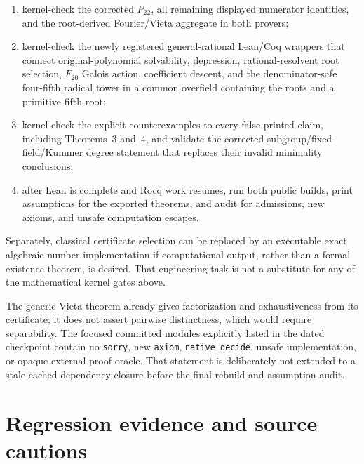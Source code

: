 \documentclass[11pt,a4paper,oneside]{article}
\newcommand{\lean}[1]{\nolinkurl{#1}}
\begin{document}
\begin{enumerate}
  the concrete six-element bases through the public imports.  The Coq source
  now proves coefficientwise that multiplication by the symmetric denominator
  gives $1+t^4+t^5+t^6+t^7+t^8$ and identifies this polynomial with the
  actual six displayed basis degrees; this closes the former source gap, but
  the new dependency graph still awaits its focused and public kernel builds;
\item kernel-check the corrected $P_{22}$, all remaining displayed numerator
  identities, and the root-derived Fourier/Vieta aggregate in both provers;
\item kernel-check the newly registered general-rational Lean/Coq wrappers
  that connect original-polynomial solvability, depression, rational-resolvent
  root selection, $F_{20}$ Galois action, coefficient descent, and the
  denominator-safe four-fifth radical tower in a common overfield containing
  the roots and a primitive fifth root;
\item kernel-check the explicit counterexamples to every false printed claim,
  including Theorems~3 and~4, and validate the corrected
  subgroup/fixed-field/Kummer degree statement that replaces their invalid
  minimality conclusions;
\item after Lean is complete and Rocq work resumes, run both public builds,
  print assumptions for the exported theorems, and audit for admissions, new
  axioms, and unsafe computation escapes.
\end{enumerate}

Separately, classical certificate selection can be replaced by an executable
exact algebraic-number implementation if computational output, rather than a
formal existence theorem, is desired.  That engineering task is not a
substitute for any of the mathematical kernel gates above.

The generic Vieta theorem already gives factorization and exhaustiveness from
its certificate; it does not assert pairwise distinctness, which would require
separability.  The focused committed modules explicitly listed in the dated
checkpoint contain no \lean{sorry}, new \lean{axiom}, \lean{native_decide},
unsafe implementation, or opaque external proof oracle.  That statement is
deliberately not extended to a stale cached dependency closure before the
final rebuild and assumption audit.

\section{Regression evidence and source cautions}
\end{document}
